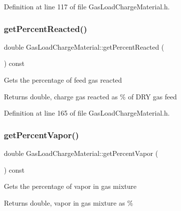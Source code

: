 Definition at line 117 of file Gas\+Load\+Charge\+Material.\+h.

\mbox{\label{class_gas_load_charge_material_af47b4c6c3e547325cadd81cbb09937ee}} 
\subsubsection{\texorpdfstring{get\+Percent\+Reacted()}{getPercentReacted()}}
{\footnotesize\ttfamily double Gas\+Load\+Charge\+Material\+::get\+Percent\+Reacted (\begin{DoxyParamCaption}{ }\end{DoxyParamCaption}) const\hspace{0.3cm}{\ttfamily [inline]}}

Gets the percentage of feed gas reacted \begin{DoxyReturn}{Returns}
double, charge gas reacted as \% of D\+RY gas feed 
\end{DoxyReturn}


Definition at line 165 of file Gas\+Load\+Charge\+Material.\+h.

\mbox{\label{class_gas_load_charge_material_a19b8ecfad235b5824b0a88903cff667a}} 
\subsubsection{\texorpdfstring{get\+Percent\+Vapor()}{getPercentVapor()}}
{\footnotesize\ttfamily double Gas\+Load\+Charge\+Material\+::get\+Percent\+Vapor (\begin{DoxyParamCaption}{ }\end{DoxyParamCaption}) const\hspace{0.3cm}{\ttfamily [inline]}}

Gets the percentage of vapor in gas mixture \begin{DoxyReturn}{Returns}
double, vapor in gas mixture as \% 
\end{DoxyReturn}


